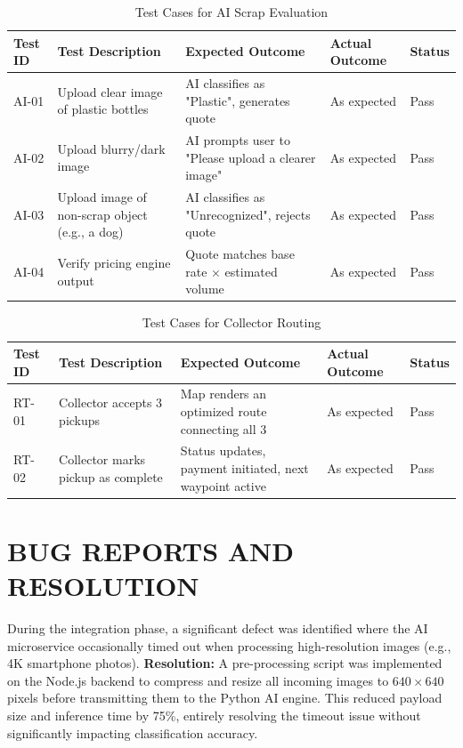 \begin{table}[H]
\centering
\caption{Test Cases for AI Scrap Evaluation}
\renewcommand{\arraystretch}{1.5}
\begin{tabular}{|p{1.5cm}|p{4cm}|p{4cm}|p{3cm}|p{1.5cm}|}
\hline
\textbf{Test ID} & \textbf{Test Description} & \textbf{Expected Outcome} & \textbf{Actual Outcome} & \textbf{Status} \\
\hline
AI-01 & Upload clear image of plastic bottles & AI classifies as "Plastic", generates quote & As expected & Pass \\
\hline
AI-02 & Upload blurry/dark image & AI prompts user to "Please upload a clearer image" & As expected & Pass \\
\hline
AI-03 & Upload image of non-scrap object (e.g., a dog) & AI classifies as "Unrecognized", rejects quote & As expected & Pass \\
\hline
AI-04 & Verify pricing engine output & Quote matches base rate $\times$ estimated volume & As expected & Pass \\
\hline
\end{tabular}
\end{table}

\begin{table}[H]
\centering
\caption{Test Cases for Collector Routing}
\renewcommand{\arraystretch}{1.5}
\begin{tabular}{|p{1.5cm}|p{4cm}|p{4cm}|p{3cm}|p{1.5cm}|}
\hline
\textbf{Test ID} & \textbf{Test Description} & \textbf{Expected Outcome} & \textbf{Actual Outcome} & \textbf{Status} \\
\hline
RT-01 & Collector accepts 3 pickups & Map renders an optimized route connecting all 3 & As expected & Pass \\
\hline
RT-02 & Collector marks pickup as complete & Status updates, payment initiated, next waypoint active & As expected & Pass \\
\hline
\end{tabular}
\end{table}

\section{BUG REPORTS AND RESOLUTION}
During the integration phase, a significant defect was identified where the AI microservice occasionally timed out when processing high-resolution images (e.g., 4K smartphone photos). \textbf{Resolution:} A pre-processing script was implemented on the Node.js backend to compress and resize all incoming images to $640 \times 640$ pixels before transmitting them to the Python AI engine. This reduced payload size and inference time by 75\%, entirely resolving the timeout issue without significantly impacting classification accuracy.
